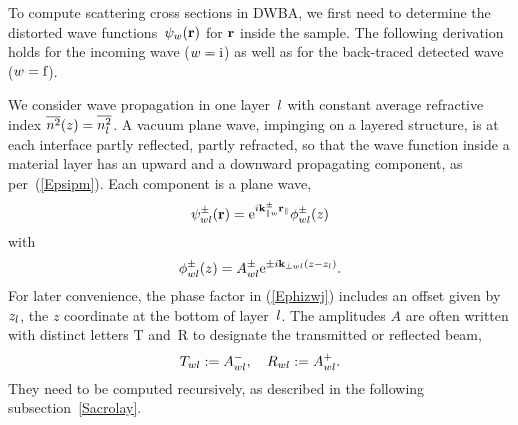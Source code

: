 To compute scattering cross sections in DWBA,
we first need to determine the distorted wave functions~$\psi_w(\mathbf{r})$
for $\mathbf{r}$ inside the sample.
The following derivation holds for the incoming wave ($w=\text{i}$)
as well as for the back-traced detected wave ($w=\text{f}$).

We consider wave propagation in one layer~$l$
%
with constant average refractive index $\overline{n^2}(z)=\overline{n_l^2}$.
A vacuum plane wave, impinging on a layered structure,
is at each interface partly reflected, partly refracted,
so that the wave function inside a material layer
has an upward and a downward propagating component,
as per~(\ref{Epsipm}).
Each component is a plane wave,
\begin{equation}
  \psi^\pm_{wl}(\mathbf{r})=\text{e}^{i\mathbf{k}^\pm_{\parallel w}\mathbf{r}_\parallel}\phi^\pm_{wl}(z)
\end{equation}
with
\begin{equation}\label{Ephizwj}
  \phi^\pm_{wl}(z)=A^\pm_{wl}\text{e}^{\pm i\mathbf{k}_{\perp wl}(z-z_l)}.
\end{equation}
%
For later convenience,
the phase factor in (\ref{Ephizwj}) includes an offset
given by~$z_l$, the $z$ coordinate at the bottom of layer~$l$.
The amplitudes $A$ are often written with distinct letters
T and~R to designate the transmitted or reflected beam,
\begin{equation}
  T_{wl} := A^-_{wl},\quad
  R_{wl} := A^+_{wl}.
\end{equation}
%
%
They need to be computed recursively,
as described in the following subsection~\ref{Sacrolay}.

